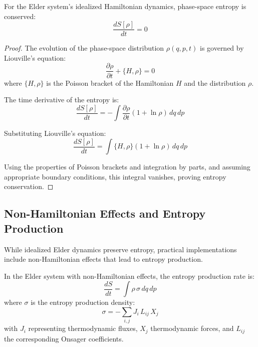 \begin{theorem}
For the Elder system's idealized Hamiltonian dynamics, phase-space entropy is conserved:
\begin{equation}
\frac{dS[\rho]}{dt} = 0
\end{equation}
\end{theorem}

\begin{proof}
The evolution of the phase-space distribution $\rho(q, p, t)$ is governed by Liouville's equation:
\begin{equation}
\frac{\partial \rho}{\partial t} + \{H, \rho\} = 0
\end{equation}
where $\{H, \rho\}$ is the Poisson bracket of the Hamiltonian $H$ and the distribution $\rho$.

The time derivative of the entropy is:
\begin{equation}
\frac{dS[\rho]}{dt} = -\int \frac{\partial \rho}{\partial t} (1 + \ln \rho) \, dq \, dp
\end{equation}

Substituting Liouville's equation:
\begin{equation}
\frac{dS[\rho]}{dt} = \int \{H, \rho\} (1 + \ln \rho) \, dq \, dp
\end{equation}

Using the properties of Poisson brackets and integration by parts, and assuming appropriate boundary conditions, this integral vanishes, proving entropy conservation.
\end{proof}

\subsection{Non-Hamiltonian Effects and Entropy Production}

While idealized Elder dynamics preserve entropy, practical implementations include non-Hamiltonian effects that lead to entropy production.

\begin{theorem}
In the Elder system with non-Hamiltonian effects, the entropy production rate is:
\begin{equation}
\frac{dS}{dt} = \int \rho \, \sigma \, dq \, dp
\end{equation}
where $\sigma$ is the entropy production density:
\begin{equation}
\sigma = -\sum_{i,j} J_i \, L_{ij} \, X_j
\end{equation}
with $J_i$ representing thermodynamic fluxes, $X_j$ thermodynamic forces, and $L_{ij}$ the corresponding Onsager coefficients.
\end{theorem}


